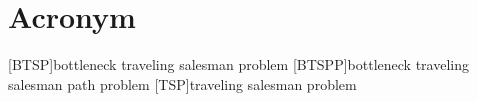 \section{Acronym}
\begin{acronym}
  [BTSP]{bottleneck traveling salesman problem}
  [BTSPP]{bottleneck traveling salesman path problem}
  [TSP]{traveling salesman problem}
\end{acronym}